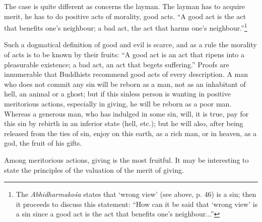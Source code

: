 \documentclass[a4paper, 11pt, oneside, english, landscape]{article}
\begin{document}
The case is quite different as concerns the layman. The layman has to acquire merit, he has to do positive acts of morality, good acts. ``A good act is the act that benefits one's neighbour; a bad act, the act that harms one's neighbour.''\footnote{The \emph{Abhidharmakośa} states that `wrong view' (see above, p. 46) is a sin; then it proceeds to discuss this statement: ``How can it be said that `wrong view' is a sin since a good act is the act that benefits one's neighbour...''}

Such a dogmatical definition of good and evil is scarce, and as a rule the morality of acts is to be known by their fruits: ``A good act is an act that ripens into a pleasurable existence; a bad act, an act that begets suffering.'' Proofs are innumerable that Buddhists recommend good acts of every description. A man who does not commit any sin will be reborn as a man, not as an inhabitant of hell, an animal or a ghost; but if this sinless person is wanting in positive meritorious actions, especially in giving, he will be reborn as a poor man. Whereas a generous man, who has indulged in some sin, will, it is true, pay for this sin by rebirth in an inferior state (hell, etc.); but he will also, after being released from the ties of sin, enjoy on this earth, as a rich man, or in heaven, as a god, the fruit of his gifts.

Among meritorious actions, giving is the most fruitful. It may be interesting to state the principles of the valuation of the merit of giving.
\end{document}
